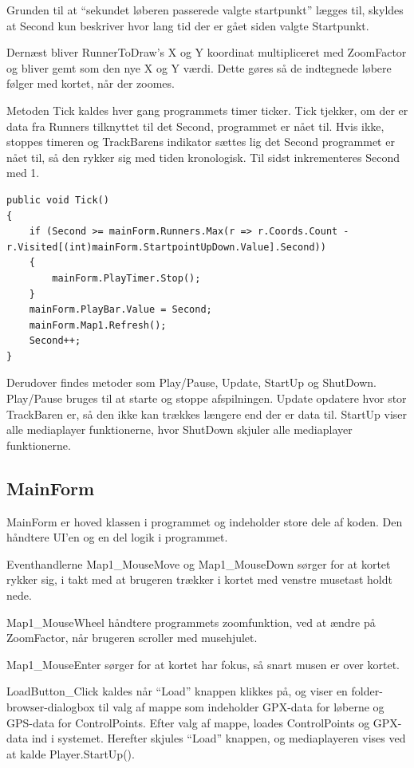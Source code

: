 Grunden til at “sekundet løberen passerede valgte startpunkt” lægges til, skyldes at Second kun beskriver hvor lang tid der er gået siden valgte Startpunkt. 

Dernæst bliver RunnerToDraw’s X og Y koordinat multipliceret med ZoomFactor og bliver gemt som den nye X og Y værdi. Dette gøres så de indtegnede løbere følger med kortet, når der zoomes. 

Metoden Tick kaldes hver gang programmets timer ticker. Tick tjekker, om der er data fra Runners tilknyttet til det Second, programmet er nået til. Hvis ikke, stoppes timeren og TrackBarens indikator sættes lig det Second programmet er nået til, så den rykker sig med tiden kronologisk. Til sidst inkrementeres Second med 1.

\begin{lstlisting}
public void Tick()
{
    if (Second >= mainForm.Runners.Max(r => r.Coords.Count - r.Visited[(int)mainForm.StartpointUpDown.Value].Second))
    {
        mainForm.PlayTimer.Stop();
    }
    mainForm.PlayBar.Value = Second;
    mainForm.Map1.Refresh();
    Second++;
}
\end{lstlisting}

Derudover findes metoder som Play/Pause, Update, StartUp og ShutDown. Play/Pause bruges til at starte og stoppe afspilningen. Update opdatere hvor stor TrackBaren er, så den ikke kan trækkes længere end der er data til. StartUp viser alle mediaplayer funktionerne, hvor ShutDown skjuler alle mediaplayer funktionerne. 

\subsection{MainForm}
MainForm er hoved klassen i programmet og indeholder store dele af koden. Den håndtere UI’en og en del logik i programmet. 

Eventhandlerne Map1\_MouseMove og Map1\_MouseDown sørger for at kortet rykker sig, i takt med at brugeren trækker i kortet med venstre musetast holdt nede. 

Map1\_MouseWheel håndtere programmets zoomfunktion, ved at ændre på ZoomFactor, når brugeren scroller med musehjulet.

Map1\_MouseEnter sørger for at kortet har fokus, så snart musen er over kortet. 

LoadButton\_Click kaldes når “Load” knappen klikkes på, og viser en folder-browser-dialogbox til valg af mappe som indeholder GPX-data for løberne og GPS-data for ControlPoints. Efter valg af mappe, loades ControlPoints og GPX-data ind i systemet. Herefter skjules “Load” knappen, og mediaplayeren vises ved at kalde Player.StartUp().

